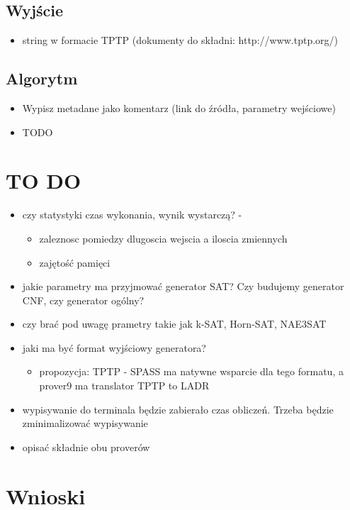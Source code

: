 \documentclass[a4paper,12pt]{article}
\begin{document}
\subsection{Wyjście}

\begin{itemize}
  \item string w formacie TPTP (dokumenty do składni: http://www.tptp.org/)
\end{itemize}

\subsection{Algorytm}
\begin{itemize}
  \item Wypisz metadane jako komentarz (link do źródła, parametry wejściowe)
  \item TODO
\end{itemize}

\newpage
\section{TO DO}
\begin{itemize}
  \item czy statystyki czas wykonania, wynik wystarczą? -
    \begin{itemize}
      \item zaleznosc pomiedzy dlugoscia wejscia a iloscia zmiennych
      \item zajętość pamięci
    \end{itemize}

  \item jakie parametry ma przyjmować generator SAT? Czy budujemy generator CNF, czy generator ogólny?
  \item  czy brać pod uwagę prametry takie jak
    k-SAT, Horn-SAT, NAE3SAT

  \item jaki ma być format wyjściowy generatora?
    \begin{itemize}
      \item propozycja: TPTP - SPASS ma natywne wsparcie dla tego formatu, a prover9 ma translator TPTP to LADR
    \end{itemize}

  \item wypisywanie do terminala będzie zabierało czas obliczeń. Trzeba będzie zminimalizować wypisywanie
  \item opisać składnie obu proverów

\end{itemize}

\newpage

\newpage
\section{Wnioski}
\lipsum[1]

\printglossary
\end{document}
